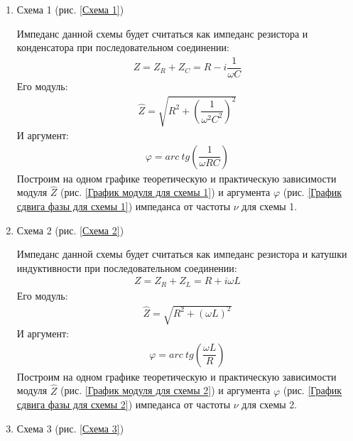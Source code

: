 \documentclass[a4paper, usenames, dvipsnames]{article}
\begin{document}
\begin{enumerate}
    \item Схема 1 (рис. \ref{Схема 1})

          Импеданс данной схемы будет считаться как импеданс
          резистора и конденсатора при последовательном соединении:
          \begin{gather*}
              Z = Z_R + Z_C = R - i\dfrac{1}{\omega C}
          \end{gather*}
          Его модуль:
          \begin{gather*}
              \hat{Z} = \sqrt{R^2 + \left(\dfrac{1}{\omega^2 C^2}\right)^2}
          \end{gather*}
          И аргумент:
          \begin{gather*}
              \varphi = arc\ tg\left(\dfrac{1}{\omega R C}\right)
          \end{gather*}
          Построим на одном графике теоретическую и практическую зависимости
          модуля $\hat{Z}$ (рис. \ref{График модуля для схемы 1})
          и аргумента $\varphi$ (рис. \ref{График сдвига фазы для схемы 1})
          импеданса от частоты $\nu$ для схемы 1.
    \item Схема 2 (рис. \ref{Схема 2})

          Импеданс данной схемы будет считаться как импеданс
          резистора и катушки индуктивности при последовательном соединении:
          \begin{gather*}
              Z = Z_R + Z_L = R + i\omega L
          \end{gather*}
          Его модуль:
          \begin{gather*}
              \hat{Z} = \sqrt{R^2 + \left(\omega L\right)^2}
          \end{gather*}
          И аргумент:
          \begin{gather*}
              \varphi = arc\ tg\left(\dfrac{\omega L}{R}\right)
          \end{gather*}
          Построим на одном графике теоретическую и практическую зависимости
          модуля $\hat{Z}$ (рис. \ref{График модуля для схемы 2})
          и аргумента $\varphi$ (рис. \ref{График сдвига фазы для схемы 2})
          импеданса от частоты $\nu$ для схемы 2.
    \item Схема 3 (рис. \ref{Схема 3})


\end{enumerate}
\end{document}
